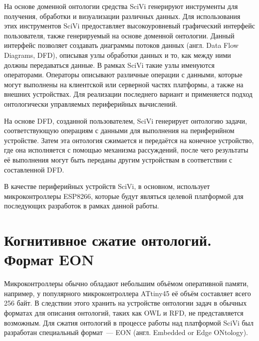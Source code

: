 На основе доменной онтологии средства SciVi генерируют инструменты для получения, обработки и визуализации различных данных.
Для использования этих инструментов SciVi предоставляет высокоуровневый графический интерфейс пользователя, также генерируемый на основе доменной онтологии.
Данный интерфейс позволяет создавать диаграммы потоков данных (англ. Data Flow Diagrams, DFD), описывая узлы обработки данных и то, как между ними должны передаваться данные.
В рамках SciVi такие узлы именуются операторами.
Операторы описывают различные операции с данными, которые могут выполнены на клиентской или серверной частях платформы, а также на внешних устройствах.
Для реализации последнего вариант и применяется подход онтологически управляемых периферийных вычислений.

На основе DFD, созданной пользователем, SciVi генерирует онтологию задачи, соответствующую операциям с данными для выполнения на периферийном устройстве.
Затем эта онтология сжимается и передаётся на конечное устройство, где она исполняется с помощью механизма рассуждений, после чего результаты её выполнения могут быть переданы другим устройствам в соответствии с составленной DFD.

В качестве периферийных устройств SciVi, в основном, использует микроконтроллеры ESP8266, которые будут являться целевой платформой для последующих разработок в рамках данной работы.

\section{Когнитивное сжатие онтологий. Формат EON}

Микроконтроллеры обычно обладают небольшим объёмом оперативной памяти, например, у популярного микроконтроллера ATtiny45 её объём составляет всего 256 байт.
В следствии этого хранить на устройстве онтологии задач в обычных форматах для описания онтологий, таких как OWL и RFD, не представляется возможным.
Для сжатия онтологий в процессе работы над платформой SciVi был разработан специальный формат~--- EON (англ. Embedded or Edge ONtology).

